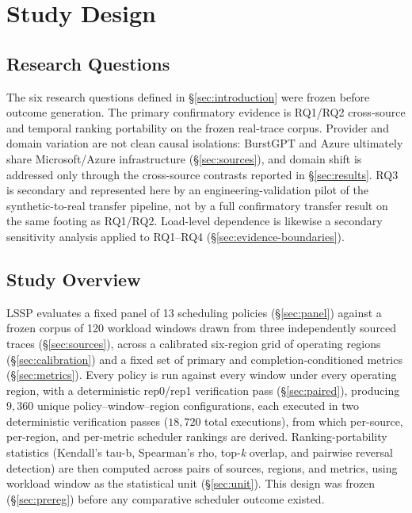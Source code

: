 \section{Study Design}
\label{sec:study-design}

\subsection{Research Questions}
\label{sec:rq}

The six research questions defined in \S\ref{sec:introduction} were frozen
before outcome generation. The primary confirmatory evidence is RQ1/RQ2 cross-source and temporal
ranking portability on the frozen real-trace corpus. Provider and domain
variation are not clean causal isolations: BurstGPT and Azure ultimately
share Microsoft/Azure infrastructure (\S\ref{sec:sources}), and domain
shift is addressed only through the cross-source contrasts reported in
\S\ref{sec:results}. RQ3 is secondary and represented here by an
engineering-validation pilot of the synthetic-to-real transfer pipeline,
not by a full confirmatory transfer result on the same footing as RQ1/RQ2.
Load-level dependence is likewise a secondary sensitivity analysis applied
to RQ1--RQ4 (\S\ref{sec:evidence-boundaries}).

\subsection{Study Overview}
\label{sec:overview}

LSSP evaluates a fixed panel of 13 scheduling policies (\S\ref{sec:panel})
against a frozen corpus of 120 workload windows drawn from three
independently sourced traces (\S\ref{sec:sources}), across a calibrated
six-region grid of operating regions (\S\ref{sec:calibration}) and a fixed
set of primary and completion-conditioned metrics (\S\ref{sec:metrics}).
Every policy is run against every window under every operating region,
with a deterministic rep0/rep1 verification pass (\S\ref{sec:paired}),
producing $9{,}360$ unique policy--window--region configurations, each executed in two deterministic verification passes ($18{,}720$ total executions), from which per-source, per-region, and
per-metric scheduler rankings are derived. Ranking-portability statistics (Kendall's tau-b, Spearman's
rho, top-\emph{k} overlap, and pairwise reversal detection) are then
computed across pairs of sources, regions, and metrics, using workload
window as the statistical unit (\S\ref{sec:unit}). This design was frozen
(\S\ref{sec:prereg}) before any comparative scheduler outcome existed.

